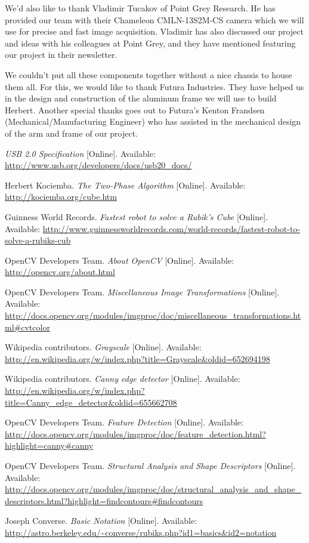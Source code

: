 \documentclass[11pt,english]{article}
\begin{document}
We'd also like to thank Vladimir Tucakov of Point Grey Research. He has provided our team with their Chameleon CMLN-13S2M-CS camera which we will use for precise and fast image acquisition. Vladimir has also discussed our project and ideas with his colleagues at Point Grey, and they have mentioned featuring our project in their newsletter.

We couldn't put all these components together without a nice chassis to house them all. For this, we would like to thank Futura Industries. They have helped us in the design and construction of the aluminum frame we will use to build Herbert. Another special thanks goes out to Futura's Kenton Frandsen (Mechanical/Manufacturing Engineer) who has assisted in the mechanical design of the arm and frame of our project.

\begin{thebibliography}{9}


\emph{USB 2.0 Specification}
[Online]. Available: \url{http://www.usb.org/developers/docs/usb20_docs/}

Herbert Kociemba.
\emph{The Two-Phase Algorithm}
[Online]. Available: \url{http://kociemba.org/cube.htm}

Guinness World Records.
\emph{Fastest robot to solve a Rubik's Cube}
[Online]. Available: \url{http://www.guinnessworldrecords.com/world-records/fastest-robot-to-solve-a-rubiks-cub}

OpenCV Developers Team.
\emph{About OpenCV}
[Online]. Available: \url{http://opencv.org/about.html}

OpenCV Developers Team.
\emph{Miscellaneous Image Transformations}
[Online]. Available: \url{http://docs.opencv.org/modules/imgproc/doc/miscellaneous_transformations.html#cvtcolor}

Wikipedia contributors.
\emph{Grayscale}
[Online]. Available: \url{http://en.wikipedia.org/w/index.php?title=Grayscale&oldid=652694198}

Wikipedia contributors.
\emph{Canny edge detector}
[Online]. Available: \url{http://en.wikipedia.org/w/index.php?title=Canny_edge_detector&oldid=655662708}

OpenCV Developers Team.
\emph{Feature Detection}
[Online]. Available: \url{http://docs.opencv.org/modules/imgproc/doc/feature_detection.html?highlight=canny#canny}

OpenCV Developers Team.
\emph{Structural Analysis and Shape Descriptors}
[Online]. Available: \url{http://docs.opencv.org/modules/imgproc/doc/structural_analysis_and_shape_descriptors.html?highlight=findcontours#findcontours}

Joseph Converse.
\emph{Basic Notation}
[Online]. Available: \url{http://astro.berkeley.edu/~converse/rubiks.php?id1=basics&id2=notation}
\end{thebibliography}
\end{document}
